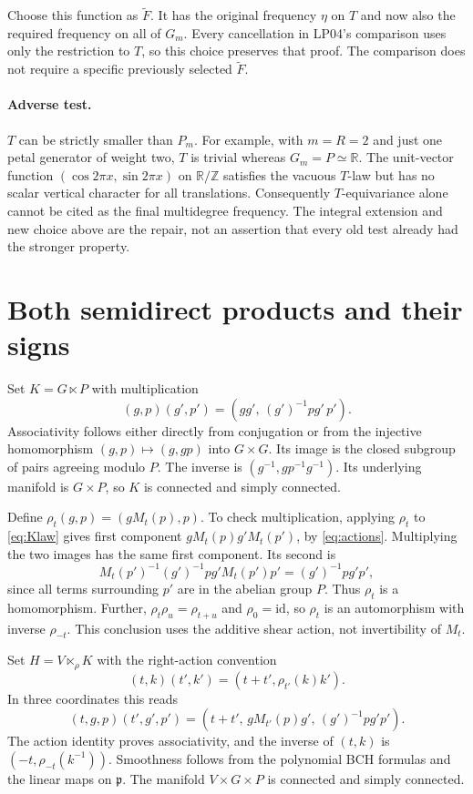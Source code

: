 \documentclass[11pt]{article}
\newcommand{\R}{\mathbb R}\newcommand{\Z}{\mathbb Z}
\newcommand{\id}{\mathrm{id}}\newcommand{\Ad}{\operatorname{Ad}}
\begin{document}
Choose this function as $\widetilde F$. It has the original frequency
$\eta$ on $T$ and now also the required frequency on all of $G_m$.
Every cancellation in LP04's comparison uses only the restriction to $T$,
so this choice preserves that proof. The comparison does not require a
specific previously selected $\widetilde F$.

\paragraph{Adverse test.}
$T$ can be strictly smaller than $P_m$. For example, with $m=R=2$
and just one petal generator of weight two, $T$ is trivial whereas
$G_m=P\simeq\R$. The unit-vector function
$(\cos 2\pi x,\sin 2\pi x)$ on $\R/\Z$ satisfies the vacuous $T$-law
but has no scalar vertical character for all translations. Consequently
$T$-equivariance alone cannot be cited as the final multidegree frequency.
The integral extension and new choice above are the repair, not an
assertion that every old test already had the stronger property.

\section{Both semidirect products and their signs}
Set $K=G\ltimes P$ with multiplication
\begin{equation}\label{eq:Klaw}
 (g,p)(g',p')=(gg',\,(g')^{-1}pg'\,p').
\end{equation}
Associativity follows either directly from conjugation or from the
injective homomorphism $(g,p)\mapsto(g,gp)$ into $G\times G$.
Its image is the closed subgroup of pairs agreeing modulo $P$.
The inverse is $(g^{-1},gp^{-1}g^{-1})$. Its underlying manifold is
$G\times P$, so $K$ is connected and simply connected.

Define $\rho_t(g,p)=(gM_t(p),p)$. To check multiplication, applying
$\rho_t$ to \eqref{eq:Klaw} gives first component
$gM_t(p)g'M_t(p')$, by \eqref{eq:actions}. Multiplying the two images
has the same first component. Its second is
\[
 M_t(p')^{-1}(g')^{-1}pg'M_t(p')p'=(g')^{-1}pg'p',
\]
since all terms surrounding $p'$ are in the abelian group $P$.
Thus $\rho_t$ is a homomorphism. Further,
$\rho_t\rho_u=\rho_{t+u}$ and $\rho_0=\id$, so $\rho_t$ is an
automorphism with inverse $\rho_{-t}$. This conclusion uses the additive
shear action, not invertibility of $M_t$.

Set $H=V\ltimes_\rho K$ with the right-action convention
\begin{equation}\label{eq:Hlaw}
 (t,k)(t',k')=(t+t',\rho_{t'}(k)k').
\end{equation}
In three coordinates this reads
\[
 (t,g,p)(t',g',p')
 =(t+t',\,gM_{t'}(p)g',\,(g')^{-1}pg'p').
\]
The action identity proves associativity, and the inverse of $(t,k)$ is
$(-t,\rho_{-t}(k^{-1}))$. Smoothness follows from the polynomial BCH
formulas and the linear maps on $\mathfrak p$. The manifold
$V\times G\times P$ is connected and simply connected.
\end{document}
